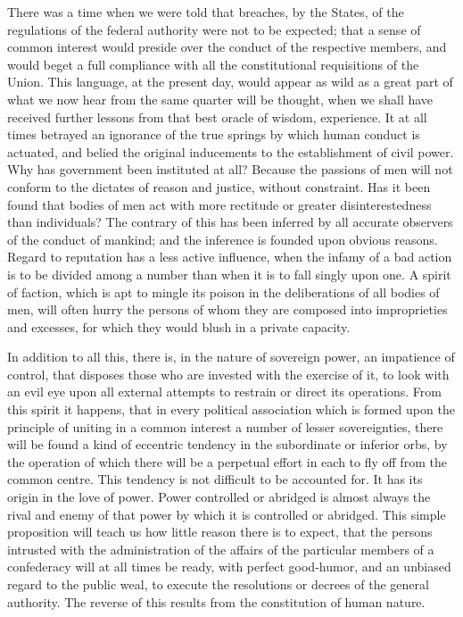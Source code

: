 There was a time when we were told that breaches, by the States, of the regulations of the federal authority were not to be expected; that a sense of common interest would preside over the conduct of the respective members, and would beget a full compliance with all the constitutional requisitions of the Union. 
This language, at the present day, would appear as wild as a great part of what we now hear from the same quarter will be thought, when we shall have received further lessons from that best oracle of wisdom, experience. 
It at all times betrayed an ignorance of the true springs by which human conduct is actuated, and belied the original inducements to the establishment of civil power. 
Why has government been instituted at all? 
Because the passions of men will not conform to the dictates of reason and justice, without constraint. 
Has it been found that bodies of men act with more rectitude or greater disinterestedness than individuals? 
The contrary of this has been inferred by all accurate observers of the conduct of mankind; and the inference is founded upon obvious reasons. 
Regard to reputation has a less active influence, when the infamy of a bad action is to be divided among a number than when it is to fall singly upon one. 
A spirit of faction, which is apt to mingle its poison in the deliberations of all bodies of men, will often hurry the persons of whom they are composed into improprieties and excesses, for which they would blush in a private capacity.

In addition to all this, there is, in the nature of sovereign power, an impatience of control, that disposes those who are invested with the exercise of it, to look with an evil eye upon all external attempts to restrain or direct its operations. 
From this spirit it happens, that in every political association which is formed upon the principle of uniting in a common interest a number of lesser sovereignties, there will be found a kind of eccentric tendency in the subordinate or inferior orbs, by the operation of which there will be a perpetual effort in each to fly off from the common centre. 
This tendency is not difficult to be accounted for. 
It has its origin in the love of power. 
Power controlled or abridged is almost always the rival and enemy of that power by which it is controlled or abridged. 
This simple proposition will teach us how little reason there is to expect, that the persons intrusted with the administration of the affairs of the particular members of a confederacy will at all times be ready, with perfect good-humor, and an unbiased regard to the public weal, to execute the resolutions or decrees of the general authority. 
The reverse of this results from the constitution of human nature.

